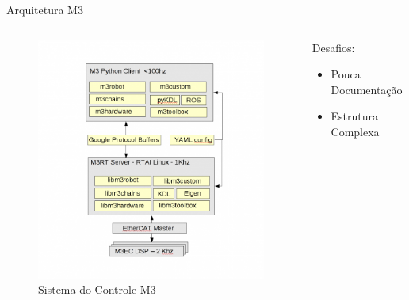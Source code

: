 \documentclass{beamer}
\begin{document}
\begin{frame}{Arquitetura M3}
\begin{columns}
\begin{column}{0.6\textwidth}
\begin{figure}
    \centering
    \includegraphics[width = \linewidth]{tex/figs/m3arch}
    \caption{Sistema do Controle M3}
    \label{fig:m3arch}
\end{figure}
\end{column}
\begin{column}{0.4\textwidth}  %
Desafios:
\begin{itemize}
    \item Pouca Documentação
    \item Estrutura Complexa
\end{itemize}
\end{column}
\end{columns}
\end{frame}
\end{document}
